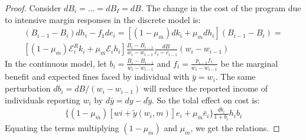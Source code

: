 \documentclass[xcolor=pdftex,dvipsnames,table]{beamer}
\begin{document}
\begin{frame}[label=proof_relation]
\begin{proof}
Consider $dB_i=...=dB_I=dB$. 
The change in the cost of the program due to intensive margin responses in the discrete model is:
\begin{align*}
(B_{i-1}-B_i)dh_i-f_1de_i=[(1-\mu_{\bar{m}})dk_i+\mu_{\bar{m}} dh_i](B_{i-1}-B_i)=\\
[(1-\mu_{\bar{m}})\mathcal{E}_i^Rk_i+\mu_{\bar{m}}\mathcal{E}_ih_i]\frac{B_i-B_{i-1}}{w_i-w_{i-1}}\frac{dB}{c_i-c_{i-1}}(w_i-w_{i-1})
\end{align*}
In the continuous model, let $b_i=\frac{B_i-B_{i-1}}{w_i-w_{i-1}}$ and $f_i=\frac{p_{i-1}f_1}{w_i-w_{i-1}}$ be the marginal benefit and expected fines faced by individual with $\bar{y}=w_i$. The same perturbation $db_i=dB/(w_i-w_{i-1})$ will reduce the reported income of individuals reporting $w_i$ by $d\bar{y}=dy-d\tilde{y}$. So the tolal effect on cost is:
\begin{align*}
\{(1-\mu_{\bar{m}})[wi+\tilde{y}(w_i,m)]e_i+\mu_{\bar{m}}\bar{e}_i\}\frac{db_i}{1+b_i}h_ib_i
\end{align*}
Equating the terms multiplying $(1-\mu_{\bar{m}})$ and $\mu_{\bar{m}}$, we get the relations. 
\end{proof}
\hyperlink{discretized}{}
\end{frame}

\setcounter{framenumber}{\value{finalframe}}
\end{document}

